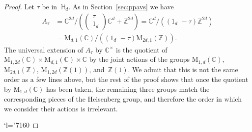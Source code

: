 \documentclass[11pt]{article}
\providecommand{\C}{}
\newcommand{\Changel}{\mathcode`l="7160}
\theoremstyle{plain}
\theoremstyle{definition}
\numberwithin{equation}{subsection}
\renewcommand{\C}{\mathbb C}
\newcommand{\Z}{\mathbb Z}
\renewcommand{\H}{\mathbb H}
\newcommand{\rmM}{\mathrm{M}}
\begin{document}
\begin{proof}
Let $\tau$ be in~$\H_d$. As in Section~\ref{sec:ppavs} we have
\[
\begin{aligned}
A_\tau& =\C^{2d}/((\substack{\tau\\ 1_d})\C^d+\Z^{2d}) =
\C^d/((1_d\,\,-\tau)\Z^{2d}) \\
& = \rmM_{d,1}(\C)/((1_d\,\,-\tau)\rmM_{2d,1}(\Z)).
\end{aligned}
\]
The universal extension of $A_\tau$ by $\C^\times$ is the quotient of
$\rmM_{1,2d}(\C)\times \rmM_{d,1}(\C)\times\C$ by the
joint actions of the groups
$\rmM_{1,d}(\C)$, $\rmM_{2d,1}(\Z)$, $\rmM_{1,2d}(\Z(1))$,
and~$\Z(1)$.
We admit that this is not the same order as a few lines above, but the
rest of the proof shows that once the quotient by $\rmM_{1,d}(\C)$ has
been taken, the remaining three groups match the corresponding pieces of
the Heisenberg group, and therefore the order in which we consider their
actions is irrelevant.

\Changel


\end{proof}
\end{document}
